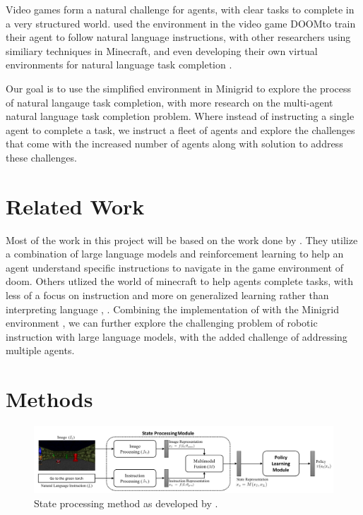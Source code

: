 \documentclass[11pt]{article}
\begin{document}
Video games form a natural challenge for agents, with clear tasks to complete in a very structured world. \cite{Chaplot2017} used the environment in the video game DOOM\texttrademark to train their agent to follow natural language instructions, with other researchers using similiary techniques in Minecraft\texttrademark \cite{Tessler2020}, and even developing their own virtual environments for natural language task completion \cite{Anderson2017} \cite{Wang2024}. 

Our goal is to use the simplified environment in Minigrid \cite{MinigridMiniworld23} to explore the process of natural langauge task completion, with more research on the multi-agent natural language task completion problem. Where instead of instructing a single agent to complete a task, we instruct a fleet of agents and explore the challenges that come with the increased number of agents along with solution to address these challenges. 

\section{Related Work}
Most of the work in this project will be based on the work done by \cite{Chaplot2017}. They utilize a combination of large language models and reinforcement learning to help an agent understand specific instructions to navigate in the game environment of doom. Others utlized the world of minecraft to help agents complete tasks, with less of a focus on instruction and more on generalized learning rather than interpreting language \cite{Oh2017}, \cite{Tessler2020}. Combining the implementation of \cite{Chaplot2017} with the Minigrid environment \cite{MinigridMiniworld23}, \cite{chevalier2018babyai} we can further explore the challenging problem of robotic instruction with large language models, with the added challenge of addressing multiple agents.

\section{Methods}
\begin{figure}[!t]
  \centering
  \includegraphics[width=\linewidth]{figs/stateprocessing.png}
  \caption{State processing method as developed by \cite{Chaplot2017}.}
  \label{fig:stateprocess}
\end{figure}
\end{document}
